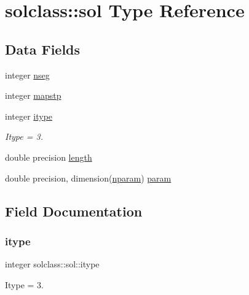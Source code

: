 \hypertarget{structsolclass_1_1sol}{}\section{solclass\+::sol Type Reference}
\label{structsolclass_1_1sol}
\subsection*{Data Fields}
\begin{DoxyCompactItemize}
\item 
integer \mbox{\hyperlink{structsolclass_1_1sol_a4e0b71eae9d2072fd83b1a4e524da7fc}{nseg}}
\item 
integer \mbox{\hyperlink{structsolclass_1_1sol_a3821a5713cb3e0e9ae5359b42644b860}{mapstp}}
\item 
integer \mbox{\hyperlink{structsolclass_1_1sol_ae34e01b972a2658f3ff55fccc3f6b99a}{itype}}
\begin{DoxyCompactList}\small\item\em Itype = 3. \end{DoxyCompactList}\item 
double precision \mbox{\hyperlink{structsolclass_1_1sol_a66fe4253293f305d51d6d7db753bb2c2}{length}}
\item 
double precision, dimension(\mbox{\hyperlink{namespacesolclass_abb5af39a08a5ff2cbe713621b2727eaf}{nparam}}) \mbox{\hyperlink{structsolclass_1_1sol_a70efaac352dbf744000a92effd3d814b}{param}}
\end{DoxyCompactItemize}


\subsection{Field Documentation}
\mbox{\label{structsolclass_1_1sol_ae34e01b972a2658f3ff55fccc3f6b99a}} 
\subsubsection{\texorpdfstring{itype}{itype}}
{\footnotesize\ttfamily integer solclass\+::sol\+::itype}



Itype = 3. 

\mbox{\label{structsolclass_1_1sol_a66fe4253293f305d51d6d7db753bb2c2}} 
